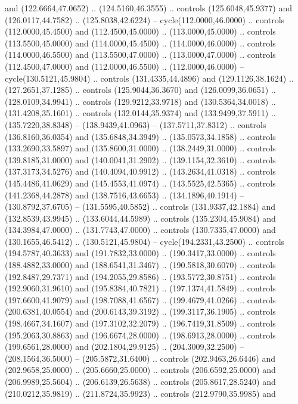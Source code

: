   and (122.6664,47.0652) .. (124.5160,46.3555) .. controls (125.6048,45.9377)
  and (126.0117,44.7582) .. (125.8038,42.6224) -- cycle(112.0000,46.0000) ..
  controls (112.0000,45.4500) and (112.4500,45.0000) .. (113.0000,45.0000) ..
  controls (113.5500,45.0000) and (114.0000,45.4500) .. (114.0000,46.0000) ..
  controls (114.0000,46.5500) and (113.5500,47.0000) .. (113.0000,47.0000) ..
  controls (112.4500,47.0000) and (112.0000,46.5500) .. (112.0000,46.0000) --
  cycle(130.5121,45.9804) .. controls (131.4335,44.4896) and (129.1126,38.1624)
  .. (127.2651,37.1285) .. controls (125.9044,36.3670) and (126.0099,36.0651) ..
  (128.0109,34.9941) .. controls (129.9212,33.9718) and (130.5364,34.0018) ..
  (131.4208,35.1601) .. controls (132.0144,35.9374) and (133.9499,37.5911) ..
  (135.7220,38.8348) -- (138.9439,41.0963) -- (137.5711,37.8312) .. controls
  (136.8160,36.0354) and (135.6848,34.3949) .. (135.0573,34.1858) .. controls
  (133.2690,33.5897) and (135.8600,31.0000) .. (138.2449,31.0000) .. controls
  (139.8185,31.0000) and (140.0041,31.2902) .. (139.1154,32.3610) .. controls
  (137.3173,34.5276) and (140.4094,40.9912) .. (143.2634,41.0318) .. controls
  (145.4486,41.0629) and (145.4553,41.0974) .. (143.5525,42.5365) .. controls
  (141.2368,44.2878) and (138.7516,43.6653) .. (134.1896,40.1914) --
  (130.8792,37.6705) -- (131.5595,40.5852) .. controls (131.9337,42.1884) and
  (132.8539,43.9945) .. (133.6044,44.5989) .. controls (135.2304,45.9084) and
  (134.3984,47.0000) .. (131.7743,47.0000) .. controls (130.7335,47.0000) and
  (130.1655,46.5412) .. (130.5121,45.9804) -- cycle(194.2331,43.2500) ..
  controls (194.5787,40.3633) and (191.7832,33.0000) .. (190.3417,33.0000) ..
  controls (188.4882,33.0000) and (188.6541,31.3467) .. (190.5818,30.6070) ..
  controls (192.8487,29.7371) and (194.2055,29.8586) .. (193.5772,30.8751) ..
  controls (192.9060,31.9610) and (195.8384,40.7821) .. (197.1374,41.5849) ..
  controls (197.6600,41.9079) and (198.7088,41.6567) .. (199.4679,41.0266) ..
  controls (200.6381,40.0554) and (200.6143,39.3192) .. (199.3117,36.1905) ..
  controls (198.4667,34.1607) and (197.3102,32.2079) .. (196.7419,31.8509) ..
  controls (195.2063,30.8863) and (196.6674,28.0000) .. (198.6913,28.0000) ..
  controls (199.6561,28.0000) and (202.1804,29.9125) .. (204.3009,32.2500) --
  (208.1564,36.5000) -- (205.5872,31.6400) .. controls (202.9463,26.6446) and
  (202.9658,25.0000) .. (205.6660,25.0000) .. controls (206.6592,25.0000) and
  (206.9989,25.5604) .. (206.6139,26.5638) .. controls (205.8617,28.5240) and
  (210.0212,35.9819) .. (211.8724,35.9923) .. controls (212.9790,35.9985) and
